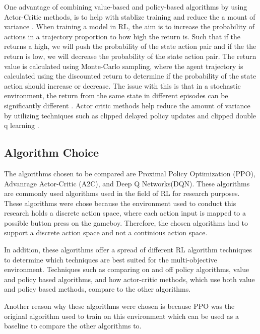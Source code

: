 
One advantage of combining value-based and policy-based algorithms by using Actor-Critic methods, is to help with stablize training and reduce the a mount of variance \cite{SergiosKaragiannakos2018}. When training a model in RL, the aim is to increase the probability of actions in a trajectory proportion to how high the return is. Such that if the returns a high, we will push the probability of the state action pair and if the the return is low, we will decrease the probability of the state action pair. The return value is calculated using Monte-Carlo sampling, where the agent trajectory is calculated using the discounted return to determine if the probability of the state action should increase or decrease. The issue with this is that in a stochastic environment, the return from the same state in different episodes can be significantly different \cite{ThomasSimonini2022A2C}. Actor critic methods help reduce the amount of variance by utilizing techniques such as clipped delayed policy updates and clipped double q learning \cite{padhye2023deep}.

\subsection{Algorithm Choice}


The algorithms chosen to be compared are Proximal Policy Optimization (PPO), Advanrage Actor-Critic (A2C), and Deep Q Networks(DQN). These algorithms are commonly used algorithms used in the field of RL for research purposes. These algorithms were chose because the environment used to conduct this research holds a discrete action space, where each action input is mapped to a possible button press on the gameboy. Therefore, the chosen algorithms had to support a discrete action space and not a continious action space.

In addition, these algorithms offer a spread of different RL algorithm techniques to determine which techniques are best suited for the multi-objective environment. Techniques such as comparing on and off policy algorithms, value and policy based algorithms, and how actor-critic methods, which use both value and policy based methods, compare to the other algorithms.

Another reason why these algorithms were chosen is because PPO was the original algorithm used to train on this environment which can be used as a baseline to compare the other algorithms to. 

